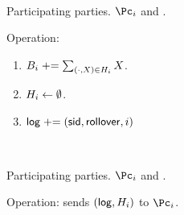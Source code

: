 



\begin{protocol}~\label{prot:ConfidentialTransactions:Update}
	\item[Participating parties.] $\Pc_i$ and \Cc.
	
	\item Operation: \Cc 
	
	\begin{enumerate}
	
	\item $B_i  \mathrel{+}= \sum_{(\cdot,X) \in H_i} X$.
	
	
	\item  $H_i \leftarrow \emptyset$.
	
	\item  $\mathsf{log} \mathrel{+}= (\mathsf{sid},\mathsf{rollover},i)$
	
	
\end{enumerate}
	
\end{protocol}

\begin{protocol}~\label{prot:ConfidentialTransactions:History}
	\item[Participating parties.] $\Pc_i$ and \Cc.
		
	\item Operation: \Cc sends $(\mathsf{log},H_i)$ to $\Pc_i$.
	
\end{protocol}

